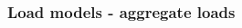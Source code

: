 \documentclass{beamer}
\begin{document}
\begin{frame}
  \frametitle{Load models - aggregate loads}
  \begin{columns}
    \begin{column}{0.5\textwidth}

\end{column}
\end{columns}
\end{frame}
\end{document}
